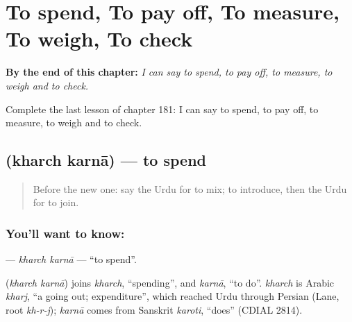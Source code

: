 
\chapter{To spend, To pay off, To measure, To weigh, To check}
\label{ch:ur-to-spend-to-pay-off-to-measure-to-weigh-to-check}

\begin{chapteropening}
\textbf{By the end of this chapter:} \emph{I can say to spend, to pay off, to measure, to weigh and to check.}

Complete the last lesson of chapter 181: I can say to spend, to pay off, to measure, to weigh and to check.
\end{chapteropening}

\section[\texorpdfstring{\ur{خرچ} \ur{کرنا} (kharch karnā)}{خرچ کرنا (kharch karnā)}]{  (kharch karnā) — to spend}

\label{lesson:UR-C181-kharch-karna}



\begin{quote}
Before the new one: say the Urdu for to mix; to introduce, then the Urdu for to join.
\end{quote}

\subsection*{You'll want to know:  }
\textbf{ } — \emph{kharch karnā} — \textquotedblleft{}to spend\textquotedblright{}.

\begin{cousinweb}
\textbf{ } (\emph{kharch karnā}) joins \emph{kharch}, \textquotedblleft{}spending\textquotedblright{}, and \emph{karnā}, \textquotedblleft{}to do\textquotedblright{}. \emph{kharch} is Arabic \emph{kharj}, \textquotedblleft{}a going out; expenditure\textquotedblright{}, which reached Urdu through Persian (Lane, root \emph{kh-r-j}); \emph{karnā} comes from Sanskrit \emph{karoti}, \textquotedblleft{}does\textquotedblright{} (CDIAL 2814).
\end{cousinweb}

